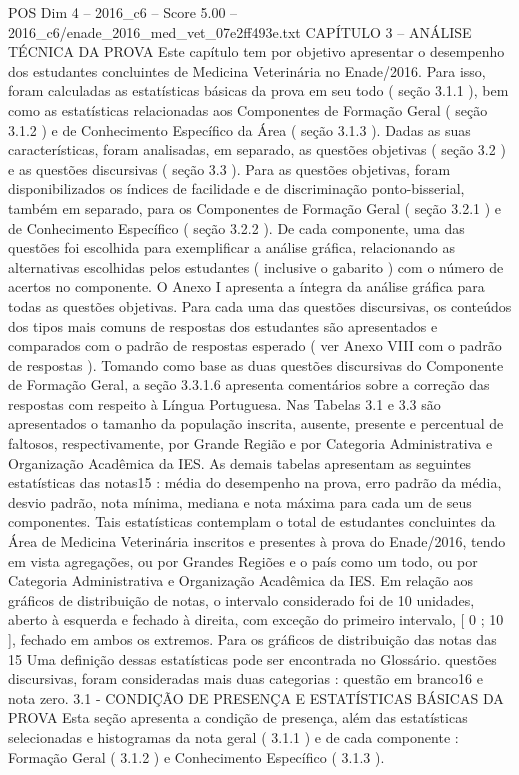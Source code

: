 \begin{textsample}{POS Dim 4 – 2016\_c6 – Score 5.00 – 2016\_c6/enade\_2016\_med\_vet\_07e2ff493e.txt}  \label{ex:f4_pos_053}
CAPÍTULO 3 – ANÁLISE TÉCNICA DA PROVA Este capítulo tem por objetivo apresentar o desempenho dos estudantes concluintes de Medicina Veterinária no Enade/2016.
Para isso, foram calculadas as estatísticas básicas da prova em seu todo ( seção 3.1.1 ), bem como as estatísticas relacionadas aos Componentes de Formação Geral ( seção 3.1.2 ) e de Conhecimento Específico da Área ( seção 3.1.3 ).
Dadas as suas características, foram analisadas, em separado, as questões objetivas ( seção 3.2 ) e as questões discursivas ( seção 3.3 ).
Para as questões objetivas, foram disponibilizados os índices de facilidade e de discriminação ponto-bisserial, também em separado, para os Componentes de Formação Geral ( seção 3.2.1 ) e de Conhecimento Específico ( seção 3.2.2 ).
De cada componente, uma das questões foi escolhida para exemplificar a análise gráfica, relacionando as alternativas escolhidas pelos estudantes ( inclusive o gabarito ) com o número de acertos no componente.
O Anexo I apresenta a íntegra da análise gráfica para todas as questões objetivas.
Para cada uma das questões discursivas, os conteúdos dos tipos mais comuns de respostas dos estudantes são apresentados e comparados com o padrão de respostas esperado ( ver Anexo VIII com o padrão de respostas ).
Tomando como base as duas questões discursivas do Componente de Formação Geral, a seção 3.3.1.6 apresenta comentários sobre a correção das respostas com respeito à Língua Portuguesa.
Nas Tabelas 3.1 e 3.3 são apresentados o tamanho da população inscrita, ausente, presente e percentual de faltosos, respectivamente, por Grande Região e por Categoria Administrativa e Organização Acadêmica da IES.
As demais tabelas apresentam as seguintes estatísticas das notas15 : média do desempenho na prova, erro padrão da média, desvio padrão, nota mínima, mediana e nota máxima para cada um de seus componentes.
Tais estatísticas contemplam o total de estudantes concluintes da Área de Medicina Veterinária inscritos e presentes à prova do Enade/2016, tendo em vista agregações, ou por Grandes Regiões e o país como um todo, ou por Categoria Administrativa e Organização Acadêmica da IES.
Em relação aos gráficos de distribuição de notas, o intervalo considerado foi de 10 unidades, aberto à esquerda e fechado à direita, com exceção do primeiro intervalo, [ 0 ; 10 ], fechado em ambos os extremos.
Para os gráficos de distribuição das notas das 15 Uma definição dessas estatísticas pode ser encontrada no Glossário. questões discursivas, foram consideradas mais duas categorias : questão em branco16 e nota zero. 3.1 - CONDIÇÃO DE PRESENÇA E ESTATÍSTICAS BÁSICAS DA PROVA Esta seção apresenta a condição de presença, além das estatísticas selecionadas e histogramas da nota geral ( 3.1.1 ) e de cada componente : Formação Geral ( 3.1.2 ) e Conhecimento Específico ( 3.1.3 ).

\end{textsample}
